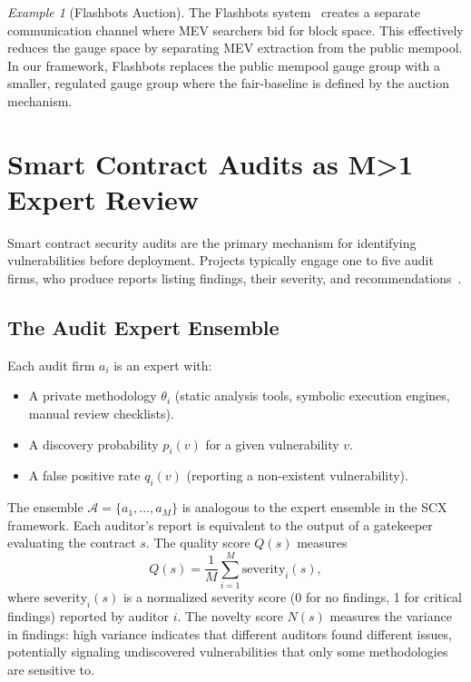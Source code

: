 \documentclass[12pt,a4paper]{article}
\theoremstyle{remark}
\newtheorem{example}[theorem]{Example}
\newcommand{\A}{\mathcal{A}}
\begin{document}
\begin{example}[Flashbots Auction]
The Flashbots system~\cite{flashbots2024} creates a separate communication
channel where MEV searchers bid for block space. This effectively reduces the
gauge space by separating MEV extraction from the public mempool. In our
framework, Flashbots replaces the public mempool gauge group with a smaller,
regulated gauge group where the fair-baseline is defined by the auction
mechanism.
\end{example}

\section{Smart Contract Audits as M>1 Expert Review}
\label{sec:audit}

Smart contract security audits are the primary mechanism for identifying
vulnerabilities before deployment. Projects typically engage one to five
audit firms, who produce reports listing findings, their severity, and
recommendations~\cite{li2020survey,crytic2023}.

\subsection{The Audit Expert Ensemble}

Each audit firm $a_i$ is an expert with:
\begin{itemize}
\item A private methodology $\theta_i$ (static analysis tools, symbolic
execution engines, manual review checklists).
\item A discovery probability $p_i(v)$ for a given vulnerability $v$.
\item A false positive rate $q_i(v)$ (reporting a non-existent vulnerability).
\end{itemize}

The ensemble $\A = \{a_1, \ldots, a_M\}$ is analogous to the expert ensemble
in the SCX framework. Each auditor's report is equivalent to the output of a
gatekeeper evaluating the contract $s$. The quality score $Q(s)$ measures
\[
Q(s) = \frac{1}{M} \sum_{i=1}^M \text{severity}_i(s),
\]
where $\text{severity}_i(s)$ is a normalized severity score (0 for no
findings, 1 for critical findings) reported by auditor $i$. The novelty score
$N(s)$ measures the variance in findings: high variance indicates that
different auditors found different issues, potentially signaling undiscovered
vulnerabilities that only some methodologies are sensitive to.
\end{document}

